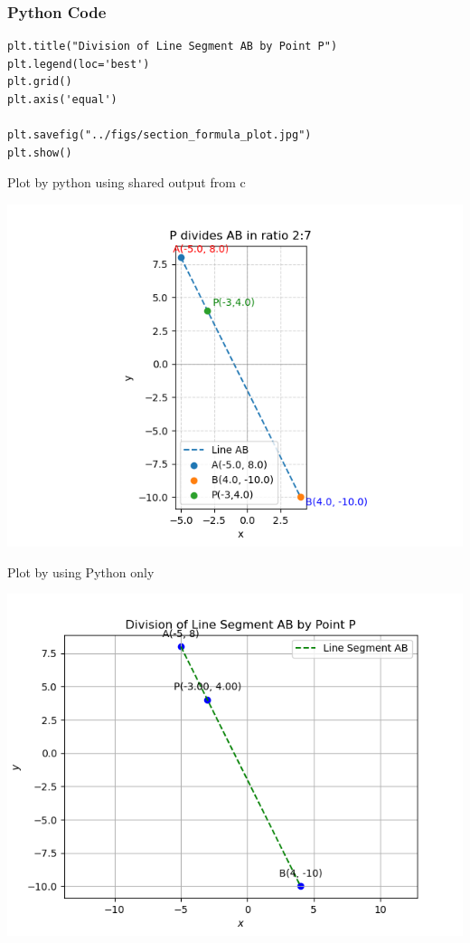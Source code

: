 \documentclass{beamer}
\begin{document}
\begin{frame}[fragile]
    \frametitle{Python Code}
    \begin{lstlisting}
plt.title("Division of Line Segment AB by Point P")
plt.legend(loc='best')
plt.grid()
plt.axis('equal')

plt.savefig("../figs/section_formula_plot.jpg")
plt.show()

\end{lstlisting}
\end{frame}
\begin{frame}{Plot by python using shared output from c}
	\begin{center}
		\includegraphics[width=0.9\columnwidth]{figs/Figure.png}
	\end{center}
\end{frame}
\begin{frame}{Plot by using Python only}
	\begin{center}
		\includegraphics[width=0.9\columnwidth]{figs/Figure_1.png}
	\end{center}
\end{frame}
\end{document}
